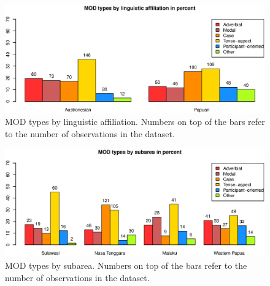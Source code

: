 \begin{figure}
\includegraphics[width=\columnwidth]{figures/MOD_Family.eps}
\caption[MOD types by linguistic affiliation]{MOD types by linguistic affiliation. Numbers on top of the bars refer to the number of observations in the dataset.}\label{fig:mod-family}
\end{figure}
\begin{figure}
\includegraphics[width=\columnwidth]{figures/MOD_Group.eps}
\caption[MOD types by subarea]{MOD types by subarea. Numbers on top of the bars refer to the number of observations in the dataset.}\label{fig:mod-group}
\end{figure}



